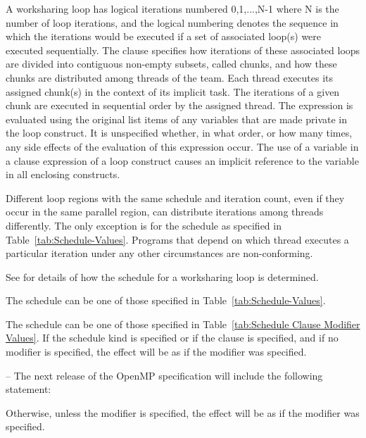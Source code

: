 A worksharing loop has logical iterations numbered 0,1,...,N-1 where N is the 
number of loop iterations, and the logical numbering denotes the sequence in 
which the iterations would be executed if a set of associated loop(s) were 
executed sequentially. The  clause specifies how iterations of 
these associated loops are divided into contiguous non-empty subsets, called 
chunks, and how these chunks are distributed among threads of the team. Each 
thread executes its assigned chunk(s) in the context of its implicit task. 
The iterations of a given chunk are executed in sequential order by the assigned thread.
The  expression is evaluated using the original list items of 
any variables that are made private in the loop construct. It is unspecified 
whether, in what order, or how many times, any side effects of the evaluation 
of this expression occur. The use of a variable in a  clause 
expression of a loop construct causes an implicit reference to the variable 
in all enclosing constructs.

Different loop regions with the same schedule and iteration count, even if 
they occur in the same parallel region, can distribute iterations among 
threads differently. The only exception is for the  schedule 
as specified in Table~\ref{tab:Schedule-Values}. Programs that depend 
on which thread executes a particular iteration under any other circumstances 
are non-conforming. 

See  
for details of how the schedule for a worksharing loop is 
determined. 

The schedule  can be one of those specified in 
Table~\ref{tab:Schedule-Values}.

The schedule  can be one of those specified in Table~\ref{tab:Schedule Clause Modifier Values}. If the  schedule kind is specified or if the  clause is specified, and if no  modifier is specified, the effect will be as if the  modifier was specified. 

\notestart
\noteheader – The next release of the OpenMP specification will include the following statement:

Otherwise, unless the  modifier is specified, the effect will be as if the  modifier was specified.

\noteend


